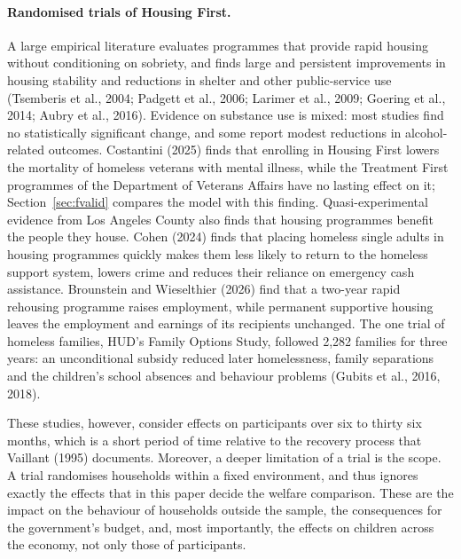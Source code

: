 \documentclass[10pt]{article}
\begin{document}
\paragraph{Randomised trials of Housing First.} A large empirical literature
evaluates programmes that provide rapid housing without conditioning on sobriety,
and finds large and persistent improvements in housing stability and reductions in
shelter and other public-service use (Tsemberis et al., 2004; Padgett et al., 2006; Larimer et al., 2009; Goering et al., 2014; Aubry et
al., 2016). Evidence on substance use is mixed: most studies find no statistically
significant change, and some report modest reductions in alcohol-related outcomes. Costantini (2025) finds that enrolling in Housing First lowers the mortality of homeless veterans with mental illness, while the Treatment First programmes of the Department of Veterans Affairs have no lasting effect on it; Section~\ref{sec:fvalid} compares the model with this finding.  Quasi-experimental evidence from Los Angeles County also finds that housing programmes benefit the people they house. Cohen (2024) finds that placing homeless single adults in housing programmes quickly makes them less likely
to return to the homeless support system, lowers crime and reduces their reliance on emergency cash assistance.
Brounstein and Wieselthier (2026) find that a two-year rapid rehousing programme raises employment, while permanent
supportive housing leaves the employment and earnings of its recipients unchanged. The one trial of homeless families, HUD's Family Options Study, followed 2,282 families for three years: an unconditional subsidy reduced later homelessness, family separations and the children's school absences and behaviour problems (Gubits et al., 2016, 2018).

 These studies, however, consider effects on participants over six to thirty six months, which is a short period of time relative to the recovery process that Vaillant (1995) documents. Moreover, a deeper limitation of a trial is the scope. A trial randomises households within a fixed environment, and thus ignores exactly the effects that in this paper decide the welfare comparison. These are the impact on the behaviour of households outside the sample, the consequences for the government's budget, and, most importantly, the effects on children across the economy, not only those of participants.
\end{document}
